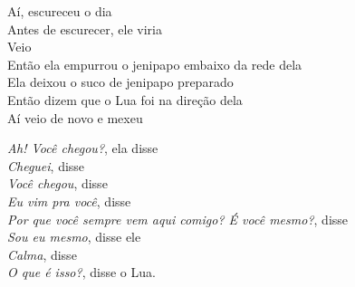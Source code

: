 \begin{linenumbers}\begingroup\raggedright
\noindent Aí, escureceu o dia\\
Antes de escurecer, ele viria\\
Veio\\
Então ela empurrou o jenipapo embaixo da rede dela\\
Ela deixou o suco de jenipapo preparado\\
Então dizem que o Lua foi na direção dela\\
Aí veio de novo e mexeu
\end{linenumbers}\endgroup

\bigskip

\begin{linenumbers}\begingroup\raggedright
\noindent \emph{Ah! Você chegou?}, ela disse\\
\emph{Cheguei}, disse\\
\emph{Você chegou}, disse\\
\emph{Eu vim pra você}, disse\\
\emph{Por que você sempre vem aqui comigo? É você mesmo?}, disse\\
\emph{Sou eu mesmo}, disse ele\\
\emph{Calma}, disse\\
\emph{O que é isso?}, disse o Lua.
\end{linenumbers}\endgroup

